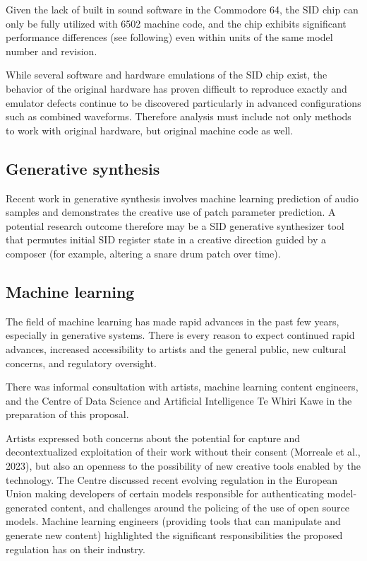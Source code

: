 \documentclass[10pt]{article}
\begin{document}
\begin{multicols*}{2}
Given the lack of built in sound software in the Commodore 64, the SID chip can only be fully utilized with 6502 machine code\cite{c64digi}, and the chip exhibits significant performance differences (see following) even within units of the same model number and revision.

While several software and hardware emulations of the SID chip exist, the behavior of the original hardware has proven difficult to reproduce exactly and emulator defects continue to be discovered particularly in advanced configurations such as combined waveforms\cite{fixcombwaveforms}. Therefore analysis must include not only methods to work with original hardware, but original machine code as well.

\subsection{Generative synthesis}

Recent work in generative synthesis\cite{neurorack} involves machine learning prediction of audio samples and demonstrates the creative use of patch parameter prediction. A potential research outcome therefore may be a SID generative synthesizer tool that permutes initial SID register state in a creative direction guided by a composer (for example, altering a snare drum patch over time).

\subsection{Machine learning}

The field of machine learning has made rapid advances in the past few years, especially in generative systems. There is every reason to expect continued rapid advances, increased accessibility to artists and the general public, new cultural concerns, and regulatory oversight.

There was informal consultation with artists, machine learning content engineers, and the Centre of Data Science and Artificial Intelligence Te Whiri Kawe in the preparation of this proposal.

Artists expressed both concerns about the potential for capture and decontextualized exploitation of their work without their consent (Morreale et al., 2023), but also an openness to the possibility of new creative tools enabled by the technology\cite{creativityai}. The Centre discussed recent evolving regulation in the European Union making developers of certain models responsible for authenticating model-generated content\cite{euairegs}, and challenges around the policing of the use of open source models. Machine learning engineers (providing tools that can manipulate and generate new content) highlighted the significant responsibilities the proposed regulation has on their industry\cite{nistai}.


\end{multicols*}
\end{document}
